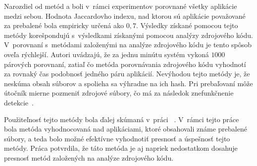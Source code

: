 Narozdiel od metód  a  boli v~rámci experimentov porovnané všetky aplikácie medzi sebou. Hodnota Jaccardovho indexu, nad ktorou sú aplikácie považované za prebalené bola empiricky určená ako $0,7$.
Výsledky získané pomocou tejto metódy korešpondujú s~výsledkami získanými pomocou analýzy zdrojového kódu. V~porovnaní s~metódami založenými na analýze zdrojového kódu je tento spôsob oveľa rýchlejší. Autori uvádzajú, že za jednu minútu systém vykoná $1000$ párových porovnaní, zatiaľ čo metóda porovnávania zdrojového kódu vyhodnotí za rovnaký čas podobnosť jedného páru aplikácií.
Nevýhodou tejto metódy je, že neskúma obsah súborov a spolieha sa výhradne na ich hash. Pri prebaľovaní môže útočník mierne pozmeniť zdrojové súbory, čo má za následok znefunkčnenie detekcie~\cite{Zhauniarovich2014}. 

Použiteľnosť tejto metódy bola ďalej skúmaná v~práci ~\cite{Gadyatskaya2016}. V~rámci tejto práce bola metóda vyhodnocovaná nad aplikáciami, ktoré obsahovali známe prebalené súbory, a teda bolo možné efektívne vyhodnotiť presnosť a úspešnosť tejto metódy. Práca potvrdila, že táto metóda je aj napriek nedostatkom dosahuje presnosť metód založených na analýze zdrojového kódu.